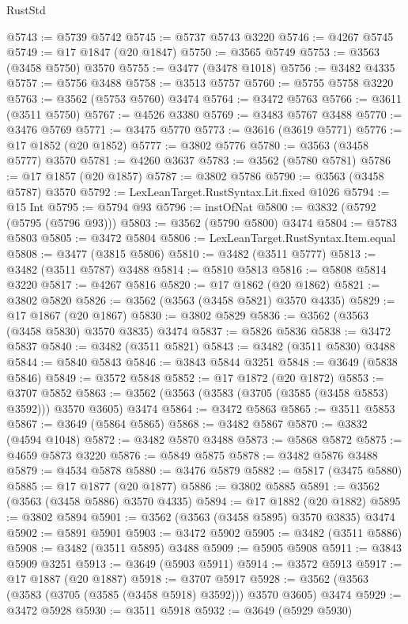 \begin{lexlean}{RustStd}
\begin{coremodule}
{\begin{coremodule}
{{{{{{{{{{{{{{{{{{{{{{{{{{{{{{{{{{{{{{{{{{{{{@5743 := @5739 @5742
@5745 := @5737 @5743 @3220
@5746 := @4267 @5745
@5749 := @17 @1847 (@20 @1847)
@5750 := @3565 @5749
@5753 := @3563 (@3458 @5750) @3570
@5755 := @3477 (@3478 @1018)
@5756 := @3482 @4335
@5757 := @5756 @3488
@5758 := @3513 @5757
@5760 := @5755 @5758 @3220
@5763 := @3562 (@5753 @5760) @3474
@5764 := @3472 @5763
@5766 := @3611 (@3511 @5750)
@5767 := @4526 @3380
@5769 := @3483 @5767 @3488
@5770 := @3476 @5769
@5771 := @3475 @5770
@5773 := @3616 (@3619 @5771)
@5776 := @17 @1852 (@20 @1852)
@5777 := @3802 @5776
@5780 := @3563 (@3458 @5777) @3570
@5781 := @4260 @3637
@5783 := @3562 (@5780 @5781)
@5786 := @17 @1857 (@20 @1857)
@5787 := @3802 @5786
@5790 := @3563 (@3458 @5787) @3570
@5792 := LexLeanTarget.RustSyntax.Lit.fixed @1026
@5794 := @15 Int
@5795 := @5794 @93
@5796 := instOfNat
@5800 := @3832 (@5792 (@5795 (@5796 @93)))
@5803 := @3562 (@5790 @5800) @3474
@5804 := @5783 @5803
@5805 := @3472 @5804
@5806 := LexLeanTarget.RustSyntax.Item.equal
@5808 := @3477 (@3815 @5806)
@5810 := @3482 (@3511 @5777)
@5813 := @3482 (@3511 @5787) @3488
@5814 := @5810 @5813
@5816 := @5808 @5814 @3220
@5817 := @4267 @5816
@5820 := @17 @1862 (@20 @1862)
@5821 := @3802 @5820
@5826 := @3562 (@3563 (@3458 @5821) @3570 @4335)
@5829 := @17 @1867 (@20 @1867)
@5830 := @3802 @5829
@5836 := @3562 (@3563 (@3458 @5830) @3570 @3835) @3474
@5837 := @5826 @5836
@5838 := @3472 @5837
@5840 := @3482 (@3511 @5821)
@5843 := @3482 (@3511 @5830) @3488
@5844 := @5840 @5843
@5846 := @3843 @5844 @3251
@5848 := @3649 (@5838 @5846)
@5849 := @3572 @5848
@5852 := @17 @1872 (@20 @1872)
@5853 := @3707 @5852
@5863 := @3562 (@3563 (@3583 (@3705 (@3585 (@3458 @5853) @3592))) @3570 @3605) @3474
@5864 := @3472 @5863
@5865 := @3511 @5853
@5867 := @3649 (@5864 @5865)
@5868 := @3482 @5867
@5870 := @3832 (@4594 @1048)
@5872 := @3482 @5870 @3488
@5873 := @5868 @5872
@5875 := @4659 @5873 @3220
@5876 := @5849 @5875
@5878 := @3482 @5876 @3488
@5879 := @4534 @5878
@5880 := @3476 @5879
@5882 := @5817 (@3475 @5880)
@5885 := @17 @1877 (@20 @1877)
@5886 := @3802 @5885
@5891 := @3562 (@3563 (@3458 @5886) @3570 @4335)
@5894 := @17 @1882 (@20 @1882)
@5895 := @3802 @5894
@5901 := @3562 (@3563 (@3458 @5895) @3570 @3835) @3474
@5902 := @5891 @5901
@5903 := @3472 @5902
@5905 := @3482 (@3511 @5886)
@5908 := @3482 (@3511 @5895) @3488
@5909 := @5905 @5908
@5911 := @3843 @5909 @3251
@5913 := @3649 (@5903 @5911)
@5914 := @3572 @5913
@5917 := @17 @1887 (@20 @1887)
@5918 := @3707 @5917
@5928 := @3562 (@3563 (@3583 (@3705 (@3585 (@3458 @5918) @3592))) @3570 @3605) @3474
@5929 := @3472 @5928
@5930 := @3511 @5918
@5932 := @3649 (@5929 @5930)
}}}}}}}}}}}}}}}}}}}}}}}}}}}}}}}}}}}}}}}}}}}}}
\end{coremodule}}
\end{coremodule}
\end{lexlean}
